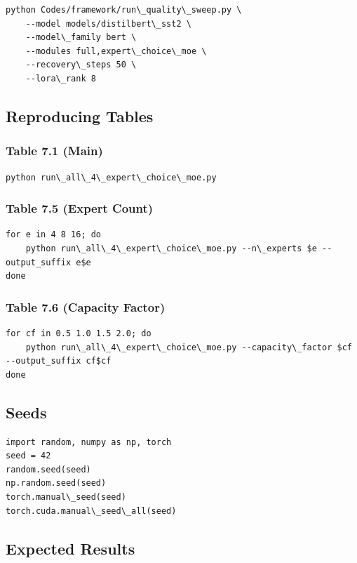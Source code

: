 \begin{lstlisting}
python Codes/framework/run\_quality\_sweep.py \
    --model models/distilbert\_sst2 \
    --model\_family bert \
    --modules full,expert\_choice\_moe \
    --recovery\_steps 50 \
    --lora\_rank 8
\end{lstlisting}

\subsection{Reproducing Tables}

\subsubsection{Table 7.1 (Main)}
\begin{lstlisting}
python run\_all\_4\_expert\_choice\_moe.py
\end{lstlisting}

\subsubsection{Table 7.5 (Expert Count)}
\begin{lstlisting}
for e in 4 8 16; do
    python run\_all\_4\_expert\_choice\_moe.py --n\_experts $e --output_suffix e$e
done
\end{lstlisting}

\subsubsection{Table 7.6 (Capacity Factor)}
\begin{lstlisting}
for cf in 0.5 1.0 1.5 2.0; do
    python run\_all\_4\_expert\_choice\_moe.py --capacity\_factor $cf --output_suffix cf$cf
done
\end{lstlisting}

\subsection{Seeds}

\begin{lstlisting}
import random, numpy as np, torch
seed = 42
random.seed(seed)
np.random.seed(seed)
torch.manual\_seed(seed)
torch.cuda.manual\_seed\_all(seed)
\end{lstlisting}

\subsection{Expected Results}


